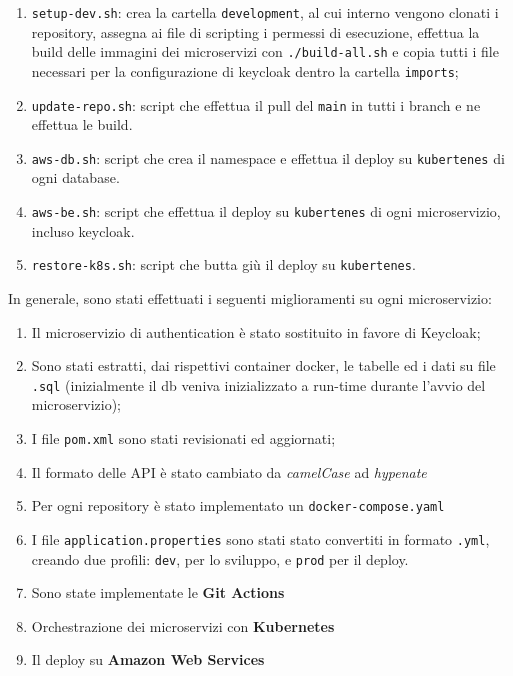 \documentclass{article}
\begin{document}
\begin{enumerate}
    \item {\texttt{setup-dev.sh}: crea la cartella \texttt{development}, al cui interno vengono clonati i repository, assegna ai file di scripting i permessi di esecuzione, effettua la build delle immagini dei microservizi con \texttt{./build-all.sh} e
        copia tutti i file necessari per la configurazione di keycloak dentro la cartella \texttt{imports}};
    \item {\texttt{update-repo.sh}: script che effettua il pull del \texttt{main} in tutti i branch e ne effettua le build}.
    \item {\texttt{aws-db.sh}: script che crea il namespace e effettua il deploy su \texttt{kubertenes} di ogni database}.
    \item {\texttt{aws-be.sh}: script che effettua il deploy su \texttt{kubertenes} di ogni microservizio, incluso keycloak}.
    \item {\texttt{restore-k8s.sh}: script che butta giù il deploy su \texttt{kubertenes}}.
\end{enumerate}

In generale, sono stati effettuati i seguenti miglioramenti su ogni microservizio:

\begin{enumerate}
    \item {Il microservizio di authentication è stato sostituito in favore di Keycloak; }
    \item {Sono stati estratti, dai rispettivi container docker, le tabelle ed i dati su file \texttt{.sql} (inizialmente il db veniva inizializzato a run-time durante l'avvio del microservizio);}
    \item {I file \texttt{pom.xml} sono stati revisionati ed aggiornati;}
    \item {Il formato delle API è stato cambiato da \textit{camelCase} ad \textit{hypenate}}
    \item {Per ogni repository è stato implementato un \texttt{docker-compose.yaml}}
    \item {I file \texttt{application.properties} sono stati stato convertiti in formato \texttt{.yml}, creando due profili:  \texttt{dev}, per lo sviluppo, e \texttt{prod} per il deploy.}
    \item {Sono state implementate le \textbf{Git Actions} }
    \item {Orchestrazione dei microservizi con \textbf{Kubernetes}}
    \item {Il deploy su \textbf{Amazon Web Services}}
\end{enumerate}
\end{document}
